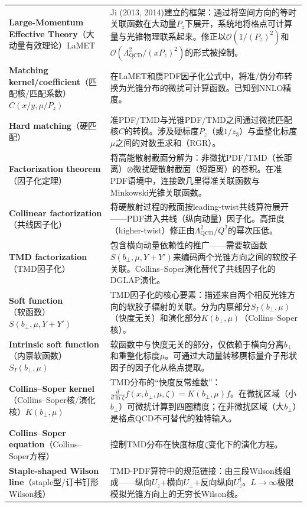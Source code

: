 \documentclass[12pt,a4paper]{ctexart}
\begin{document}
\begin{longtable}{p{3.5cm}p{9cm}}
\textbf{Large-Momentum Effective Theory}（大动量有效理论）LaMET& Ji (2013, 2014)建立的框架：通过将空间方向的等时关联函数在大动量$P_z$下展开，系统地将格点可计算量与光锥物理联系起来。修正以$\mathcal{O}(1/(P_z)^2)$和$\mathcal{O}(\Lambda_{\text{QCD}}^2/(x P_z)^2)$的形式被控制。\\
\textbf{Matching kernel/coefficient}（匹配核/匹配系数）$C(x/y,\mu/P_z)$& 在LaMET和赝PDF因子化公式中，将准/伪分布转换为光锥分布的微扰可计算函数。已知到NNLO精度。\\
\textbf{Hard matching}（硬匹配）& 准PDF/TMD与光锥PDF/TMD之间通过微扰匹配核$C$的转换。涉及硬标度$P_z$（或$1/z_3$）与重整化标度$\mu$之间的对数重求和（RGR）。\\
\textbf{Factorization theorem}（因子化定理）& 将高能散射截面分解为：非微扰PDF/TMD（长距离）$\otimes$微扰硬散射截面（短距离）的卷积。在准PDF语境中，连接欧几里得准关联函数与Minkowski光锥关联函数。\\
\textbf{Collinear factorization}（共线因子化）& 将硬散射过程的截面按leading-twist共线算符展开——PDF进入共线（纵向动量）因子化。高扭度（higher-twist）修正由$\Lambda_{\text{QCD}}^2/Q^2$的幂次压低。\\
\textbf{TMD factorization}（TMD因子化）& 包含横向动量依赖性的推广——需要软函数$S(b_\perp,\mu,Y+Y')$来编码两个光锥方向之间的软胶子关联。Collins--Soper演化替代了共线因子化的DGLAP演化。\\
\textbf{Soft function}（软函数）$S(b_\perp,\mu,Y+Y')$& TMD因子化的核心要素：描述来自两个相反光锥方向的软胶子辐射的关联。分为内禀部分$S_I(b_\perp,\mu)$（快度无关）和演化部分$K(b_\perp,\mu)$（Collins--Soper核）。\\
\textbf{Intrinsic soft function}（内禀软函数）$S_I(b_\perp,\mu)$& 软函数中与快度无关的部分，仅依赖于横向分离$b_\perp$和重整化标度$\mu$。可通过大动量转移赝标量介子形状因子的因子化从格点提取。\\
\textbf{Collins--Soper kernel}（Collins--Soper核/演化核）$K(b_\perp,\mu)$& TMD分布的``快度反常维数''：$\frac{d}{d\ln\zeta} f(x,b_\perp,\mu,\zeta) = K(b_\perp,\mu) f$。在微扰区域（小$b_\perp$）可微扰计算到四圈精度；在非微扰区域（大$b_\perp$）是格点QCD不可替代的独特输入。\\
\textbf{Collins--Soper equation}（Collins--Soper方程）& 控制TMD分布在快度标度$\zeta$变化下的演化方程。\\
\textbf{Staple-shaped Wilson line}（staple型/订书钉形Wilson线）& TMD-PDF算符中的规范链接：由三段Wilson线组成——纵向$U_z$+横向$U_\perp$+反向纵向$U_z^\dagger$。$L\to\infty$极限模拟光锥方向上的无穷长Wilson线。\\

\end{longtable}
\end{document}
